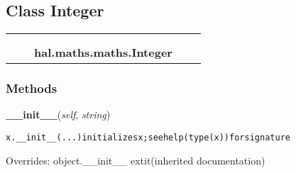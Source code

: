 \subsection{Class Integer}

    \label{hal:maths:maths:Integer}
\begin{tabular}{cccccc}
\multicolumn{2}{r}{\settowidth{\BCL}{object}\multirow{2}{\BCL}{object}}
&&
  \\\cline{3-3}
  &&\multicolumn{1}{c|}{}
&&
  \\
&&\multicolumn{2}{l}{\textbf{hal.maths.maths.Integer}}
\end{tabular}



  \subsubsection{Methods}

    \vspace{0.5ex}

\hspace{.8\funcindent}\begin{boxedminipage}{\funcwidth}

    \raggedright \textbf{\_\_init\_\_}(\textit{self}, \textit{string})

\setlength{\parskip}{2ex}
\begin{alltt}
x.\_\_init\_\_(...) initializes x; see help(type(x)) for signature
\end{alltt}

\setlength{\parskip}{1ex}
      Overrides: object.\_\_init\_\_ 	extit{(inherited documentation)}

    \end{boxedminipage}

    \label{hal:maths:maths:Integer:is_probably_prime}

    \vspace{0.5ex}

